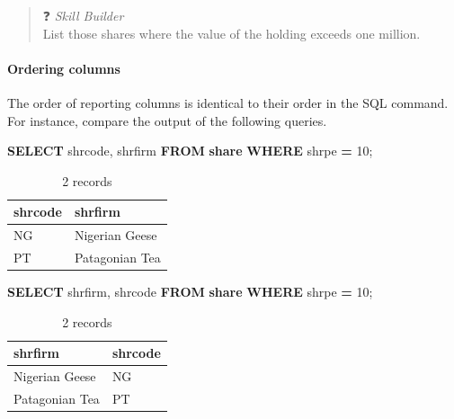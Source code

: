 \documentclass[
]{article}
\newenvironment{Shaded}{\begin{snugshade}}{\end{snugshade}}
\newcommand{\DecValTok}[1]{\textcolor[rgb]{0.00,0.00,0.81}{#1}}
\newcommand{\KeywordTok}[1]{\textcolor[rgb]{0.13,0.29,0.53}{\textbf{#1}}}
\newcommand{\NormalTok}[1]{#1}
\newcommand{\OperatorTok}[1]{\textcolor[rgb]{0.81,0.36,0.00}{\textbf{#1}}}
\begin{document}
\begin{quote}
❓ \emph{Skill Builder}\\
List those shares where the value of the holding exceeds one million.
\end{quote}

\hypertarget{ordering-columns}{%
\paragraph*{Ordering columns}\label{ordering-columns}}

The order of reporting columns is identical to their order in the SQL command. For instance, compare the output of the following queries.

\begin{Shaded}
\begin{Highlighting}[]
\KeywordTok{SELECT}\NormalTok{ shrcode, shrfirm }\KeywordTok{FROM} \KeywordTok{share} \KeywordTok{WHERE}\NormalTok{ shrpe }\OperatorTok{=} \DecValTok{10}\NormalTok{;}
\end{Highlighting}
\end{Shaded}

\begin{table}

\caption{\label{tab:unnamed-chunk-17}2 records}
\centering
\begin{tabular}[t]{l|l}
\hline
shrcode & shrfirm\\
\hline
NG & Nigerian Geese\\
\hline
PT & Patagonian Tea\\
\hline
\end{tabular}
\end{table}

\begin{Shaded}
\begin{Highlighting}[]
\KeywordTok{SELECT}\NormalTok{ shrfirm, shrcode }\KeywordTok{FROM} \KeywordTok{share} \KeywordTok{WHERE}\NormalTok{ shrpe }\OperatorTok{=} \DecValTok{10}\NormalTok{;}
\end{Highlighting}
\end{Shaded}

\begin{table}

\caption{\label{tab:unnamed-chunk-18}2 records}
\centering
\begin{tabular}[t]{l|l}
\hline
shrfirm & shrcode\\
\hline
Nigerian Geese & NG\\
\hline
Patagonian Tea & PT\\
\hline
\end{tabular}
\end{table}
\end{document}
